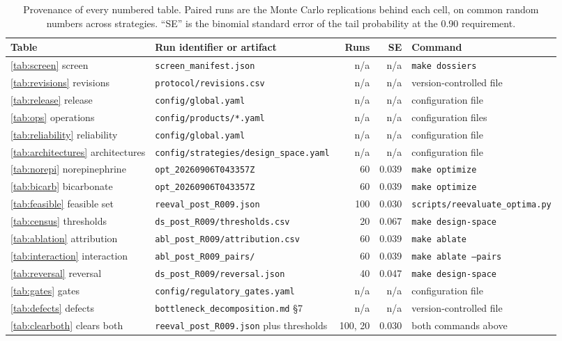 \documentclass[11pt,letterpaper]{article}
\begin{document}
\begin{table}[htbp]
\centering
\caption{Provenance of every numbered table. Paired runs are the Monte Carlo replications
behind each cell, on common random numbers across strategies. ``SE'' is the binomial
standard error of the tail probability at the 0.90 requirement.}
\label{tab:provenance}
\footnotesize
\setlength{\tabcolsep}{4pt}
\begin{tabular}{@{}llrrl@{}}
\toprule
Table & Run identifier or artifact & Runs & SE & Command \\
\midrule
\ref{tab:screen} screen & \texttt{screen\_manifest.json} & n/a & n/a & \texttt{make dossiers} \\
\ref{tab:revisions} revisions & \texttt{protocol/revisions.csv} & n/a & n/a & version-controlled file \\
\ref{tab:release} release & \texttt{config/global.yaml} & n/a & n/a & configuration file \\
\ref{tab:ops} operations & \texttt{config/products/*.yaml} & n/a & n/a & configuration files \\
\ref{tab:reliability} reliability & \texttt{config/global.yaml} & n/a & n/a & configuration file \\
\ref{tab:architectures} architectures & \texttt{config/strategies/design\_space.yaml} & n/a & n/a & configuration file \\
\ref{tab:norepi} norepinephrine & \texttt{opt\_20260906T043357Z} & 60 & 0.039 & \texttt{make optimize} \\
\ref{tab:bicarb} bicarbonate & \texttt{opt\_20260906T043357Z} & 60 & 0.039 & \texttt{make optimize} \\
\ref{tab:feasible} feasible set & \texttt{reeval\_post\_R009.json} & 100 & 0.030 & \texttt{scripts/reevaluate\_optima.py} \\
\ref{tab:census} thresholds & \texttt{ds\_post\_R009/thresholds.csv} & 20 & 0.067 & \texttt{make design-space} \\
\ref{tab:ablation} attribution & \texttt{abl\_post\_R009/attribution.csv} & 60 & 0.039 & \texttt{make ablate} \\
\ref{tab:interaction} interaction & \texttt{abl\_post\_R009\_pairs/} & 60 & 0.039 & \texttt{make ablate --pairs} \\
\ref{tab:reversal} reversal & \texttt{ds\_post\_R009/reversal.json} & 40 & 0.047 & \texttt{make design-space} \\
\ref{tab:gates} gates & \texttt{config/regulatory\_gates.yaml} & n/a & n/a & configuration file \\
\ref{tab:defects} defects & \texttt{bottleneck\_decomposition.md} \S7 & n/a & n/a & version-controlled file \\
\ref{tab:clearboth} clears both & \texttt{reeval\_post\_R009.json} plus thresholds & 100, 20 & 0.030 & both commands above \\
\bottomrule
\end{tabular}
\end{table}
\end{document}
